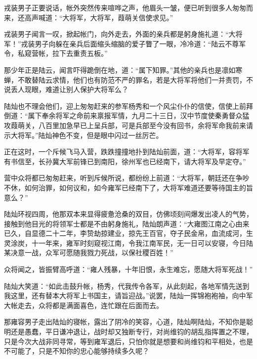 戎装男子正要说话，帐外突然传来喧哗之声，他眉头一皱，便已听到很多人匆匆而来，还高声喊道：“大将军，大将军，葭萌关信使求见。”

戎装男子闻言一叹，掀起帐门，向外走去，外面的亲兵都是躬身施礼道：“大将军！”戎装男子向躲在亲兵后面缩头缩脑的爱子瞥了一眼，冷冷道：“陆云不尊军令，私窥营帐，拉下去重责五板。”

那少年正是陆云，闻言吓得跪倒在地，道：“属下知罪。”其他的亲兵也是凛如寒蝉，不敢替陆云求情，他们也有防范不严的罪名，若是大将军将他们一并责罚，不说丢人现眼，难道让别人保护大将军么？

陆灿也不理会他们，迎上匆匆赶来的参军杨秀和一个风尘仆仆的信使，信使上前拜倒道：“属下奉余将军之命前来禀报军情，九月二十三日，汉中节度使秦勇督众猛攻葭萌关，八百里加急早已上呈兵部，可是兵部至今没有回书，余将军命我前来请示大将军。”陆灿神色不变，但是眼中闪过一丝厉芒。

正在这时，一个斥候飞马入营，跌跌撞撞地扑到陆灿前面，道：“大将军，容将军有书信至，长孙冀大军前锋已到南阳，徐州军也已经南下，请大将军及早定夺。”

营中众将都已匆匆赶来，听到斥候所说，都纷纷上前道：“大将军，朝廷还在争吵不休，如何治罪，如何议和，如今雍军已经南下了，大将军难道还要等待国主的旨意么？”

陆灿环视四周，他那双本来显得疲惫沧桑的双目，仿佛顷刻间爆发出凌人的气势，接触到他目光的将领军士都是不由躬身施礼，陆灿朗声道：“大雍图江南之心由来已久，自显德二十二年，李贽劫掠建业，掠先王百官，夺子民金帛，血流成河，生灵涂炭，十一年来，雍军时刻窥视江南，令我江南军民，无一日可以安寝，今日陆某决意一战，众军可愿随我戮力死战，以保社稷百姓！”

众将闻之，皆振臂高呼道：“雍人残暴，十年旧恨，永生难忘，愿随大将军死战！”

陆灿大笑道：“如此击鼓升帐，杨秀，代我传令各军，从此刻起，各地军情先送到我这里，还有替本大将军上书国主，请旨迎战。”说罢，陆灿一挥锦袍袍袖，向中军大帐走去，众将都是满面喜色，连忙跟在后面而去。

那雍容男子走出陆灿的寝帐，露出了阴冷的笑容，心道，陆灿啊陆灿，不知你是聪明还是愚蠢，平日谦冲退让，战时却又独断专行，对尚维钧的胡乱指挥置之不理，只是今次大战非同寻常，等到雍军退后，只怕你就是想要和尚维钧和平相处，也是不可能了，只是不知你的忠心能够持续多久呢？

